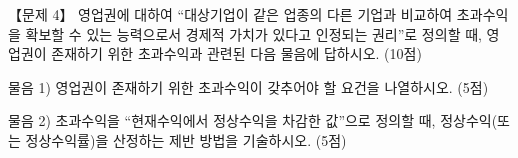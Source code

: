 \begin{longquestion}{【문제 4】}
영업권에 대하여 “대상기업이 같은 업종의 다른 기업과 비교하여 초과수익을 확보할 수 있는 능력으로서 경제적 가치가 있다고 인정되는 권리”로 정의할 때, 영업권이 존재하기 위한 초과수익과 관련된 다음 물음에 답하시오. (10점) \par
\medskip\noindent 물음 1) 영업권이 존재하기 위한 초과수익이 갖추어야 할 요건을 나열하시오. (5점) \par
\medskip\noindent 물음 2) 초과수익을 “현재수익에서 정상수익을 차감한 값”으로 정의할 때, 정상수익(또는 정상수익률)을 산정하는 제반 방법을 기술하시오. (5점) \par
\end{longquestion}
